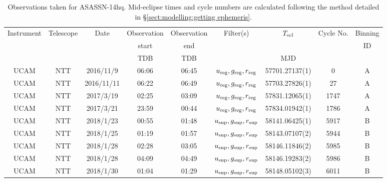 \begin{table}
	\begin{center}
		\caption{Observations taken for ASASSN-14hq. Mid-eclipse times and cycle numbers are calculated following the method detailed in \S\ref{sect:modelling:getting ephemeris}.}
		\label{table:observing:observation logs ASASSN-14hq}
		\begin{tabular}{ccccccccc}
			\hline
			Instrument & Telescope & Date & Observation  & Observation  & Filter(s) & $T_{\rm ecl}$ & Cycle No. & Binning \\
			 &  &  &  start &  end &  &  &  & ID \\
			 &  &  & TDB & TDB &  & MJD &  &  \\
			\hline
			\hline
			 UCAM & NTT & 2016/11/9  & 06:06 & 06:45 & $u_{\rm reg},g_{\rm reg},r_{\rm reg}$ & 57701.27137(1) &    0 & A \\
			 UCAM & NTT & 2016/11/11 & 06:22 & 06:49 & $u_{\rm reg},g_{\rm reg},r_{\rm reg}$ & 57703.27826(1) &   27 & A \\
			 UCAM & NTT & 2017/3/19  & 02:25 & 03:09 & $u_{\rm reg},g_{\rm reg},r_{\rm reg}$ & 57831.12065(1) & 1747 & A \\
			 UCAM & NTT & 2017/3/21  & 23:59 & 00:44 & $u_{\rm reg},g_{\rm reg},r_{\rm reg}$ & 57834.01942(1) & 1786 & A \\
			 UCAM & NTT & 2018/1/23  & 00:55 & 01:48 & $u_{\rm sup},g_{\rm sup},r_{\rm sup}$ & 58141.06425(1) & 5917 & B \\
			 UCAM & NTT & 2018/1/25  & 01:19 & 01:57 & $u_{\rm sup},g_{\rm sup},r_{\rm sup}$ & 58143.07107(2) & 5944 & B \\
			 UCAM & NTT & 2018/1/28  & 02:28 & 03:05 & $u_{\rm sup},g_{\rm sup},r_{\rm sup}$ & 58146.11846(2) & 5985 & B \\
			 UCAM & NTT & 2018/1/28  & 04:09 & 04:49 & $u_{\rm sup},g_{\rm sup},r_{\rm sup}$ & 58146.19283(2) & 5986 & B \\
			 UCAM & NTT & 2018/1/30  & 01:04 & 01:29 & $u_{\rm sup},g_{\rm sup},r_{\rm sup}$ & 58148.05102(3) & 6011 & B \\
			\hline
			\end{tabular}
	\end{center}
\end{table}